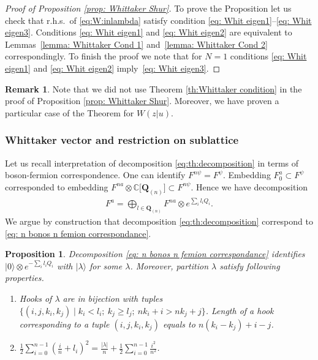 \documentclass[pdftex]{sigma}
\numberwithin{equation}{section}
\newtheorem{Proposition}[Theorem]{Proposition}
\theoremstyle{definition}
\newtheorem{Remark}[Theorem]{Remark}
\newcommand{\vac}{|0 \rangle}
\newcommand{\Q}{\mathbf{Q}_{(n)}}
\begin{document}
\begin{proof}[Proof of Proposition \ref{prop: Whittaker Shur}]
To prove the Proposition let us check that r.h.s.\ of \eqref{eq:W:inlambda} satisfy condition \eqref{eq: Whit eigen1}--\eqref{eq: Whit eigen3}. Conditions \eqref{eq: Whit eigen1} and \eqref{eq: Whit eigen2} are equivalent to Lemmas~\ref{lemma: Whittaker Cond 1} and~\ref{lemma: Whittaker Cond 2} correspondingly. To finish the proof we note that for $N=1$ conditions \eqref{eq: Whit eigen1} and \eqref{eq: Whit eigen2} imply~\eqref{eq: Whit eigen3}.
\end{proof}

\begin{Remark}
Note that we did not use Theorem \ref{th:Whittaker condition} in the proof of Proposition \ref{prop: Whittaker Shur}. Moreover, we have proven a particular case of the Theorem for $W(z|u)$.
\end{Remark}
\subsubsection{Whittaker vector and restriction on sublattice}

Let us recall interpretation of decomposition \eqref{eq:th:decomposition} in terms of boson-fermion correspondence. One can identify $F^{n \psi} = F^{\psi}$. Embedding $F^a_{0} \subset F^{\psi}$ corresponded to embedding $F^{na} \otimes \mathbb{C}\big[\Q\big] \subset F^{n \psi} $. Hence we have decomposition
\begin{gather} \label{eq: n bonos n femion correspondance}
F^a = \bigoplus_{l \in \Q} F^{na} \otimes e^{\sum_i l_i Q_i}.
\end{gather}
We argue by construction that decomposition \eqref{eq:th:decomposition} correspond to \eqref{eq: n bonos n femion correspondance}.
\begin{Proposition} \label{prop: n-core}
Decomposition \eqref{eq: n bonos n femion correspondance} identifies $\vac \otimes e^{-\sum_i l_i Q_i}$ with $| \lambda \rangle$ for some $\lambda$. Moreover, partition $\lambda$ satisfy following properties.
\begin{enumerate}[$(i)$]\itemsep=0pt
\item \label{i}Hooks of $\lambda$ are in bijection with tuples $\{ (i,j,k_i, k_j) \mid k_i<l_i; \ k_j \geqslant l_j; \ nk_i + i > nk_j + j \}$. Length of a hook corresponding to a tuple $(i, j, k_i, k_j)$ equals to $n(k_i - k_j) + i-j$.
\item \label{ii} $\frac{1}{2} \sum\limits_{i=0}^{n-1} (\frac{i}{n}+l_i)^2 = \frac{| \lambda |}{n} + \frac12 \sum\limits_{i=0}^{n-1} \frac{i^2}{n^2}$.
\end{enumerate}
\end{Proposition}
\end{document}
